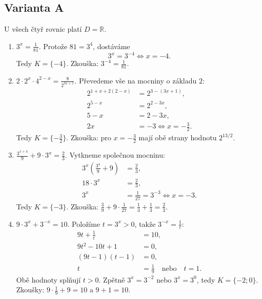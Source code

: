 \documentclass[a4paper,10pt]{article}
\begin{document}
\subsection*{Varianta A}
U všech čtyř rovnic platí $D=\mathbb{R}$.
\begin{enumerate}
\item $\displaystyle 3^x=\frac1{81}$.
Protože $81=3^4$, dostáváme
\[
3^x=3^{-4}\iff x=-4.
\]
Tedy $K=\{-4\}$. Zkouška: $3^{-4}=\frac1{81}$.

\item $\displaystyle 2\cdot2^x\cdot4^{2-x}=\frac8{2^{3x+1}}$.
Převedeme vše na mocniny o základu $2$:
\begin{align*}
2^{1+x+2(2-x)}&=2^{3-(3x+1)},\\
2^{5-x}&=2^{2-3x},\\
5-x&=2-3x,\\
2x&=-3 \iff x=-\frac32.
\end{align*}
Tedy $K=\{-\frac32\}$. Zkouška: pro $x=-\frac32$ mají obě strany hodnotu $2^{13/2}$.

\item $\displaystyle \frac{3^{x+4}}9+9\cdot3^x=\frac23$.
Vytkneme společnou mocninu:
\begin{align*}
3^x\left(\frac{3^4}{9}+9\right)&=\frac23,\\
18\cdot3^x&=\frac23,\\
3^x&=\frac1{27}=3^{-3}\iff x=-3.
\end{align*}
Tedy $K=\{-3\}$. Zkouška: $\frac39+9\cdot\frac1{27}=\frac13+\frac13=\frac23$.

\item $\displaystyle 9\cdot3^x+3^{-x}=10$.
Položíme $t=3^x>0$, takže $3^{-x}=\frac1t$:
\begin{align*}
9t+\frac1t&=10,\\
9t^2-10t+1&=0,\\
(9t-1)(t-1)&=0,\\
t&=\frac19\quad\text{nebo}\quad t=1.
\end{align*}
Obě hodnoty splňují $t>0$. Zpětně $3^x=3^{-2}$ nebo $3^x=3^0$, tedy
$K=\{-2;0\}$. Zkoušky: $9\cdot\frac19+9=10$ a $9+1=10$.
\end{enumerate}

\newpage
\end{document}
